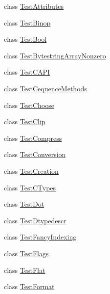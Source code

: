 \begin{DoxyCompactItemize}
\item 
class \hyperlink{classnumpy_1_1core_1_1tests_1_1test__multiarray_1_1TestAttributes}{Test\+Attributes}
\item 
class \hyperlink{classnumpy_1_1core_1_1tests_1_1test__multiarray_1_1TestBinop}{Test\+Binop}
\item 
class \hyperlink{classnumpy_1_1core_1_1tests_1_1test__multiarray_1_1TestBool}{Test\+Bool}
\item 
class \hyperlink{classnumpy_1_1core_1_1tests_1_1test__multiarray_1_1TestBytestringArrayNonzero}{Test\+Bytestring\+Array\+Nonzero}
\item 
class \hyperlink{classnumpy_1_1core_1_1tests_1_1test__multiarray_1_1TestCAPI}{Test\+C\+A\+PI}
\item 
class \hyperlink{classnumpy_1_1core_1_1tests_1_1test__multiarray_1_1TestCequenceMethods}{Test\+Cequence\+Methods}
\item 
class \hyperlink{classnumpy_1_1core_1_1tests_1_1test__multiarray_1_1TestChoose}{Test\+Choose}
\item 
class \hyperlink{classnumpy_1_1core_1_1tests_1_1test__multiarray_1_1TestClip}{Test\+Clip}
\item 
class \hyperlink{classnumpy_1_1core_1_1tests_1_1test__multiarray_1_1TestCompress}{Test\+Compress}
\item 
class \hyperlink{classnumpy_1_1core_1_1tests_1_1test__multiarray_1_1TestConversion}{Test\+Conversion}
\item 
class \hyperlink{classnumpy_1_1core_1_1tests_1_1test__multiarray_1_1TestCreation}{Test\+Creation}
\item 
class \hyperlink{classnumpy_1_1core_1_1tests_1_1test__multiarray_1_1TestCTypes}{Test\+C\+Types}
\item 
class \hyperlink{classnumpy_1_1core_1_1tests_1_1test__multiarray_1_1TestDot}{Test\+Dot}
\item 
class \hyperlink{classnumpy_1_1core_1_1tests_1_1test__multiarray_1_1TestDtypedescr}{Test\+Dtypedescr}
\item 
class \hyperlink{classnumpy_1_1core_1_1tests_1_1test__multiarray_1_1TestFancyIndexing}{Test\+Fancy\+Indexing}
\item 
class \hyperlink{classnumpy_1_1core_1_1tests_1_1test__multiarray_1_1TestFlags}{Test\+Flags}
\item 
class \hyperlink{classnumpy_1_1core_1_1tests_1_1test__multiarray_1_1TestFlat}{Test\+Flat}
\item 
class \hyperlink{classnumpy_1_1core_1_1tests_1_1test__multiarray_1_1TestFormat}{Test\+Format}

\end{DoxyCompactItemize}
